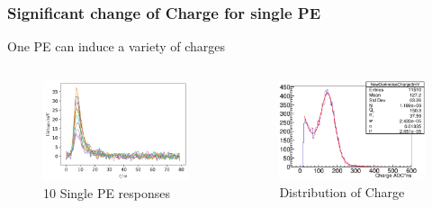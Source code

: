 \documentclass{beamer}
\begin{document}
\begin{frame}
\frametitle{Significant change of Charge for single PE}
\hspace{8mm}One PE can induce a variety of charges
\begin{columns}
\begin{figure}
    \centering
    \caption{10 Single PE responses}
    \includegraphics[width=1.0\linewidth]{img/spewaves.png}
\end{figure}
\begin{figure}
    \centering
    \caption{Distribution of Charge}
    \includegraphics[width=1.0\linewidth]{img/chargehist.png}
\end{figure}
\end{columns}
\end{frame}
\end{document}

